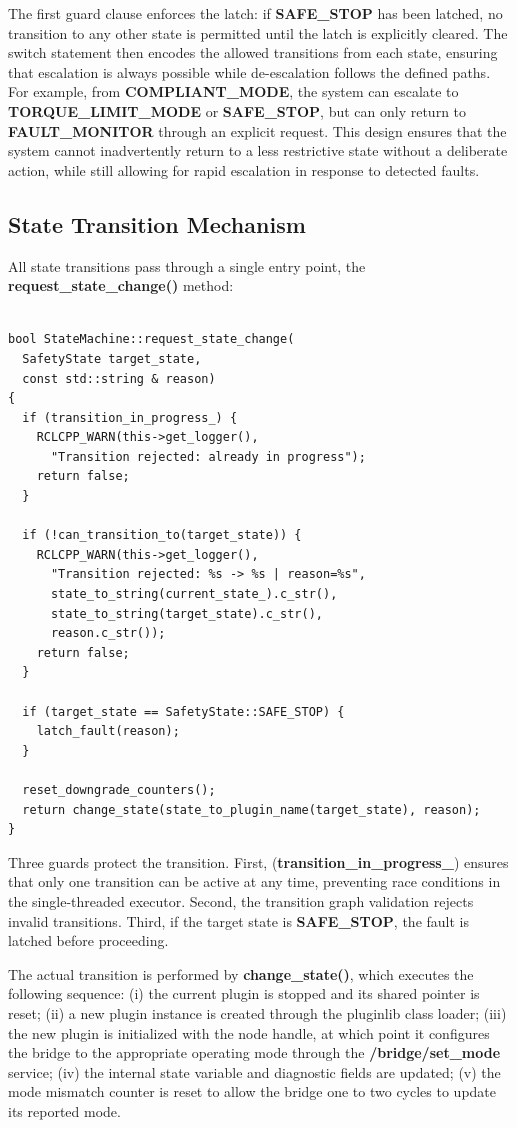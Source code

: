 The first guard clause enforces the latch: if \textbf{SAFE\_STOP} has been latched, no transition to any other state is permitted until the latch is explicitly cleared. The switch statement then encodes the allowed transitions from each state, ensuring that escalation is always possible while de-escalation follows the defined paths. For example, from \textbf{COMPLIANT\_MODE}, the system can escalate to \textbf{TORQUE\_LIMIT\_MODE} or \textbf{SAFE\_STOP}, but can only return to \textbf{FAULT\_MONITOR} through an explicit request. This design ensures that the system cannot inadvertently return to a less restrictive state without a deliberate action, while still allowing for rapid escalation in response to detected faults.


\subsection{State Transition Mechanism}
All state transitions pass through a single entry point, the \textbf{request\_state\_change()} method:

\begin{verbatim}

bool StateMachine::request_state_change(
  SafetyState target_state,
  const std::string & reason)
{
  if (transition_in_progress_) {
    RCLCPP_WARN(this->get_logger(),
      "Transition rejected: already in progress");
    return false;
  }

  if (!can_transition_to(target_state)) {
    RCLCPP_WARN(this->get_logger(),
      "Transition rejected: %s -> %s | reason=%s",
      state_to_string(current_state_).c_str(),
      state_to_string(target_state).c_str(),
      reason.c_str());
    return false;
  }

  if (target_state == SafetyState::SAFE_STOP) {
    latch_fault(reason);
  }

  reset_downgrade_counters();
  return change_state(state_to_plugin_name(target_state), reason);
}

\end{verbatim}

Three guards protect the transition. First, (\textbf{transition\_in\_progress\_}) ensures that only one transition can be active at any time, preventing race conditions in the single-threaded executor. Second, the transition graph validation rejects invalid transitions. Third, if the target state is \textbf{SAFE\_STOP}, the fault is latched before proceeding.

The actual transition is performed by \textbf{change\_state()}, which executes the following sequence: (i) the current plugin is stopped and its shared pointer is reset; (ii) a new plugin instance is created through the pluginlib class loader; (iii) the new plugin is initialized with the node handle, at which point it configures the bridge to the appropriate operating mode through the \textbf{/bridge/set\_mode} service; (iv) the internal state variable and diagnostic fields are updated; (v) the mode mismatch counter is reset to allow the bridge one to two cycles to update its reported mode.

